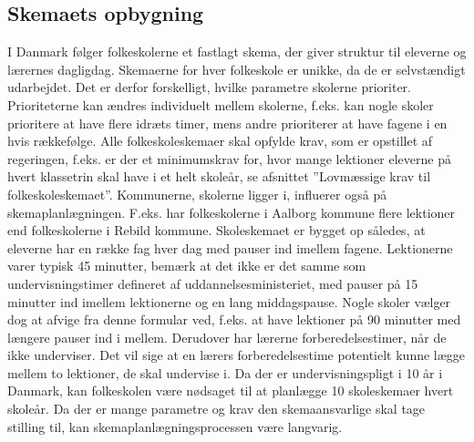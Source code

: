 \subsection{Skemaets opbygning}
I Danmark følger folkeskolerne et fastlagt skema, der giver struktur til eleverne og lærernes dagligdag. Skemaerne for hver folkeskole er unikke, da de er selvstændigt udarbejdet. Det er derfor forskelligt, hvilke parametre skolerne prioriter. Prioriteterne kan ændres individuelt mellem skolerne, f.eks. kan nogle skoler prioritere at have flere idræts timer, mens andre prioriterer at have fagene i en hvis rækkefølge. Alle folkeskoleskemaer skal opfylde krav, som er opstillet af regeringen, f.eks. er der et minimumskrav for, hvor mange lektioner eleverne på hvert klassetrin skal have i et helt skoleår, se afsnittet ”Lovmæssige krav til folkeskoleskemaet”.
Kommunerne, skolerne ligger i, influerer også på skemaplanlægningen. F.eks. har folkeskolerne i Aalborg kommune flere lektioner end folkeskolerne i Rebild kommune. Skoleskemaet er bygget op således, at eleverne har en række fag hver dag med pauser ind imellem fagene. Lektionerne varer typisk 45 minutter, bemærk at det ikke er det samme som undervisningstimer defineret af uddannelsesministeriet, med pauser på 15 minutter ind imellem lektionerne og en lang middagspause.
Nogle skoler vælger dog at afvige fra denne formular ved, f.eks. at have lektioner på 90 minutter med længere pauser ind i mellem. Derudover har lærerne forberedelsestimer, når de ikke underviser. Det vil sige at en lærers forberedelsestime potentielt kunne lægge mellem to lektioner, de skal undervise i. Da der er undervisningspligt i 10 år i Danmark, kan folkeskolen være nødsaget til at planlægge 10 skoleskemaer hvert skoleår. Da der er mange parametre og krav den skemaansvarlige skal tage stilling til, kan skemaplanlægningsprocessen være langvarig.
